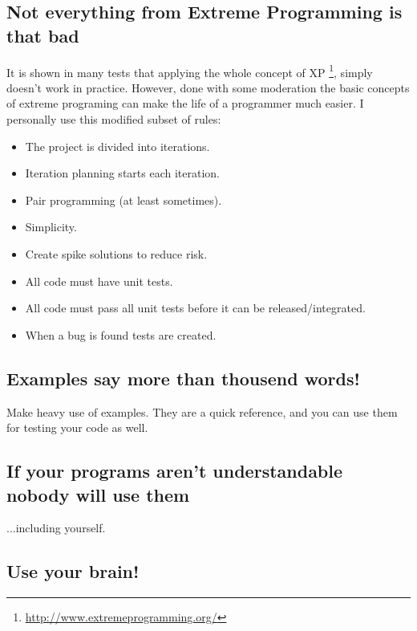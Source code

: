 \documentclass[letterpaper,10pt,english]{manual}
\begin{document}
\subsection{Not everything from Extreme Programming is that bad}

It is shown in many tests that applying the whole concept of XP \footnote{
\href{http://www.extremeprogramming.org/}{http://www.extremeprogramming.org/}
}, simply
doesn't work in practice.
However, done with some moderation the basic concepts of extreme programing can make
the life of a programmer much easier. I personally use this modified subset of rules:
\begin{itemize}
\item {} 
The project is divided into iterations.

\item {} 
Iteration planning starts each iteration.

\item {} 
Pair programming (at least sometimes).

\item {} 
Simplicity.

\item {} 
Create spike solutions to reduce risk.

\item {} 
All code must have unit tests.

\item {} 
All code must pass all unit tests before it  can be released/integrated.

\item {} 
When a bug is found tests are created.

\end{itemize}


\subsection{Examples say more than thousend words!}

Make heavy use of examples. They are a quick reference, and you
can use them for testing your code as well.


\subsection{If your programs aren't understandable nobody will use them}

...including yourself.


\subsection{Use your brain!}
\end{document}
